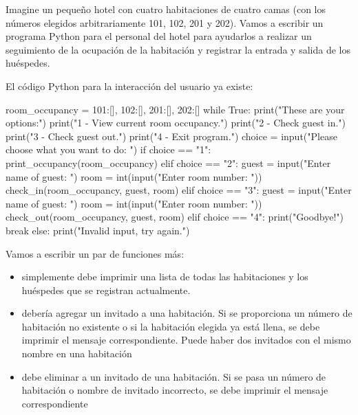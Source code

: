 \begin{exercise}
Imagine un pequeño hotel con cuatro habitaciones de cuatro camas (con los números elegidos arbitrariamente 101, 102, 201 y 202). Vamos a escribir un programa Python para el personal del hotel para ayudarlos a realizar un seguimiento de la ocupación de la habitación y registrar la entrada y salida de los huéspedes. 

El código Python para la interacción del usuario ya existe:

\begin{small}
\begin{python}
room_occupancy = {101:[], 102:[], 201:[], 202:[]} 
while True:
    print("These are your options:")
    print("1 - View current room occupancy.")
    print("2 - Check guest in.")
    print("3 - Check guest out.")
    print("4 - Exit program.")
    choice = input("Please choose what you want to do: ") 
    if choice == "1":
        print_occupancy(room_occupancy)
    elif choice == "2":
        guest = input("Enter name of guest: ")
        room = int(input("Enter room number: "))
        check_in(room_occupancy, guest, room)
    elif choice == "3":
        guest = input("Enter name of guest: ")
        room = int(input("Enter room number: "))
        check_out(room_occupancy, guest, room)
    elif choice == "4":
        print("Goodbye!")
        break
    else:
        print("Invalid input, try again.")
\end{python}
\end{small}

Vamos a escribir un par de funciones más:


\begin{itemize}
\item {} 
simplemente debe imprimir una lista de todas las habitaciones y los huéspedes que se registran actualmente.

\item {} 
debería agregar un invitado a una habitación. Si se proporciona un número de habitación no existente o si la habitación elegida ya está llena, se debe imprimir el mensaje correspondiente. Puede haber dos invitados con el mismo nombre en una habitación

\item {} 
debe eliminar a un invitado de una habitación. Si se pasa un número de habitación o nombre de invitado incorrecto, se debe imprimir el mensaje correspondiente
\end{itemize}

\end{exercise} 